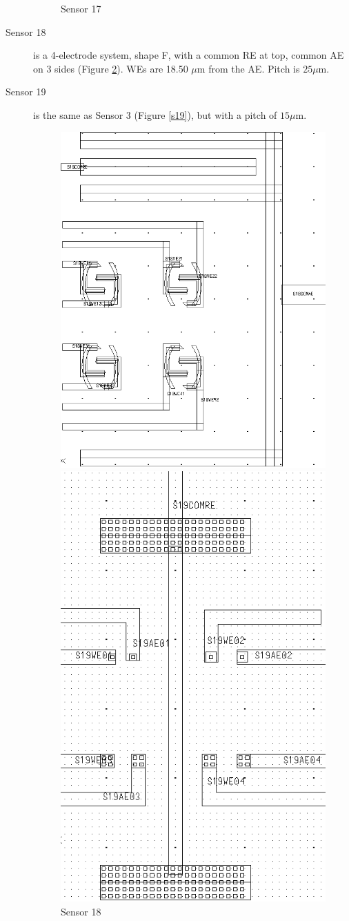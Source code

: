 \begin{description}
\begin{figure}
\begin{minipage}{0.5\linewidth}
		\caption{Sensor 17}
		\label{s17}
	\end{minipage}
\end{figure}

\item[Sensor 18] is a 4-electrode system, shape F, with a common RE at top, common AE on 3 sides (Figure \ref{s18}). WEs are 18.50 $\mu \mathrm{m}$ from the AE. Pitch is $25 \mu \mathrm{m}$.
\item[Sensor 19] is the same as Sensor 3 (Figure \ref{s19}), but with a pitch of $15 \mu \mathrm{m}$.

\begin{figure}
	\begin{minipage}{0.5\linewidth}
		\centering
		\includegraphics[width=0.6\linewidth]{figures/s18.png}
		\caption{Sensor 18}
		\label{s18}
	\end{minipage}
	\begin{minipage}{0.5\linewidth}
		\centering
		\includegraphics[width=0.6\linewidth]{figures/s19.png}

\end{minipage}
\end{figure}
\end{description}
